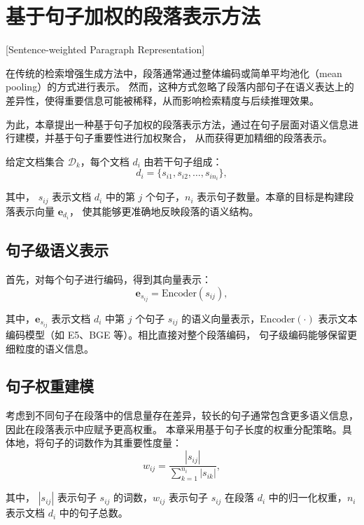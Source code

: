 \section{基于句子加权的段落表示方法}[Sentence-weighted Paragraph Representation]

在传统的检索增强生成方法中，段落通常通过整体编码或简单平均池化（mean pooling）的方式进行表示。
然而，这种方式忽略了段落内部句子在语义表达上的差异性，使得重要信息可能被稀释，从而影响检索精度与后续推理效果。

为此，本章提出一种基于句子加权的段落表示方法，通过在句子层面对语义信息进行建模，并基于句子重要性进行加权聚合，
从而获得更加精细的段落表示。

给定文档集合 $\mathcal{D}_k$，每个文档 $d_i$ 由若干句子组成：
\begin{equation}
d_i = \{s_{i1}, s_{i2}, \dots, s_{i n_i}\},
\end{equation}

\noindent 其中， $s_{ij}$ 表示文档 $d_i$ 中的第 $j$ 个句子，$n_i$ 表示句子数量。本章的目标是构建段落表示向量 $\mathbf{e}_{d_i}$，
使其能够更准确地反映段落的语义结构。

\subsection{句子级语义表示}

首先，对每个句子进行编码，得到其向量表示：
\begin{equation}
\mathbf{e}_{s_{ij}} = \text{Encoder}(s_{ij}),
\end{equation}

\noindent 其中，$\mathbf{e}_{s_{ij}}$ 表示文档 $d_i$ 中第 $j$ 个句子 $s_{ij}$ 的语义向量表示，$\text{Encoder}(\cdot)$ 表示文本编码模型（如 E5、BGE\cite{chen2024bge} 等）。相比直接对整个段落编码，
句子级编码能够保留更细粒度的语义信息。

\subsection{句子权重建模}

考虑到不同句子在段落中的信息量存在差异，较长的句子通常包含更多语义信息，因此在段落表示中应赋予更高权重。
本章采用基于句子长度的权重分配策略。具体地，将句子的词数作为其重要性度量：
\begin{equation}
w_{ij} = \frac{|s_{ij}|}{\sum_{k=1}^{n_i} |s_{ik}|},
\end{equation}

\noindent 其中， $|s_{ij}|$ 表示句子 $s_{ij}$ 的词数，$w_{ij}$ 表示句子 $s_{ij}$ 在段落 $d_i$ 中的归一化权重，$n_i$ 表示文档 $d_i$ 中的句子总数。

